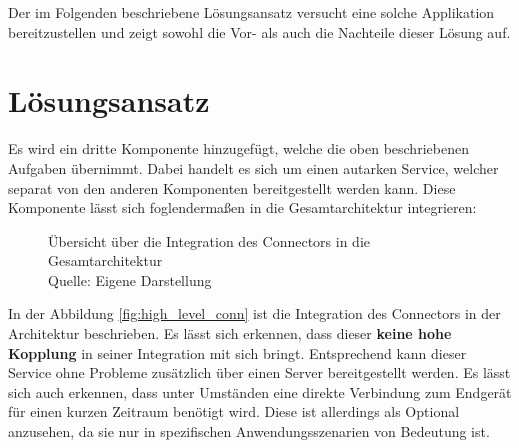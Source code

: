 Der im Folgenden beschriebene Lösungsansatz versucht eine solche Applikation bereitzustellen und zeigt sowohl die Vor- als auch die Nachteile dieser Lösung auf.

\section{Lösungsansatz}

Es wird ein dritte Komponente hinzugefügt, welche die oben beschriebenen Aufgaben übernimmt. Dabei handelt es sich um einen autarken Service, welcher separat von den anderen Komponenten bereitgestellt werden kann. Diese Komponente lässt sich foglendermaßen in die Gesamtarchitektur integrieren:

\begin{figure}[h]
    \centering
    \caption{Übersicht über die Integration des Connectors in die Gesamtarchitektur\\Quelle: Eigene Darstellung}
    \label{fig:high_level_conn}
\end{figure}

\pagebreak

In der Abbildung \vref{fig:high_level_conn} ist die Integration des Connectors in der Architektur beschrieben. Es lässt sich erkennen, dass dieser \textbf{keine hohe Kopplung} in seiner Integration mit sich bringt. Entsprechend kann dieser Service ohne Probleme zusätzlich über einen Server bereitgestellt werden. Es lässt sich auch erkennen, dass unter Umständen eine direkte Verbindung zum Endgerät für einen kurzen Zeitraum benötigt wird. Diese ist allerdings als Optional anzusehen, da sie nur in spezifischen Anwendungsszenarien von Bedeutung ist.

